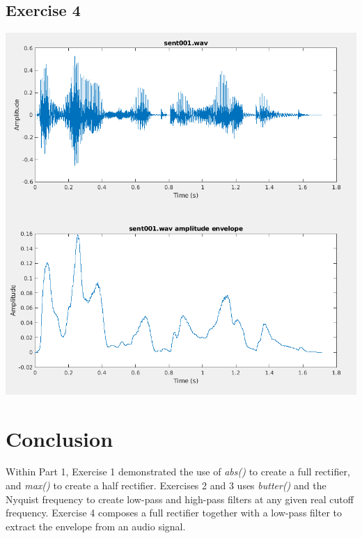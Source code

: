 \documentclass[11pt]{article}
\begin{document}
\subsection{Exercise 4}



\includegraphics[width=\textwidth]{exercise4.png}

\section{Conclusion}

Within Part 1, Exercise 1 demonstrated the use of \textit{abs()} to create a full rectifier, and \textit{max()} to create a half rectifier.
Exercises 2 and 3 uses \textit{butter()} and the Nyquist frequency to create low-pass and high-pass filters at any given real cutoff frequency.
Exercise 4 composes a full rectifier together with a low-pass filter to extract the envelope from an audio signal.
\end{document}
